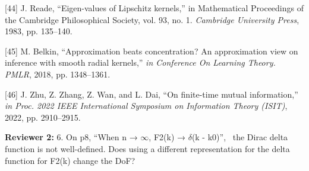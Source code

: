 \documentclass[a4paper,12pt]{article}
\begin{document}
{	[44] J. Reade, “Eigen-values of Lipschitz kernels,” in Mathematical Proceedings of the Cambridge Philosophical Society, vol. 93, no. 1.
	{\it Cambridge University Press}, 1983, pp. 135–140.
	
	
	[45] M. Belkin, “Approximation beats concentration? An approximation view on inference with smooth radial kernels,” {\it in Conference
	On Learning Theory. PMLR}, 2018, pp. 1348–1361.
	
	[46] J. Zhu, Z. Zhang, Z. Wan, and L. Dai, “On finite-time mutual information,” {\it in Proc. 2022 IEEE International Symposium on
	Information Theory (ISIT)}, 2022, pp. 2910–2915.
}

\textbf{Reviewer 2:}
6. On p8, “When n → $\infty$, F2(k) → $\delta$(k - k0)”,  the Dirac delta function is not well-defined. Does using a different representation for the delta function for F2(k) change the DoF?


{}
\end{document}
